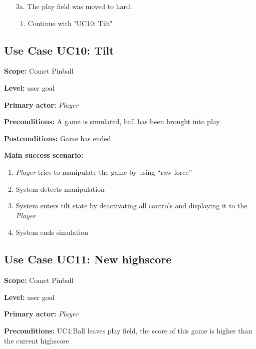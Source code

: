 \documentclass[fontsize=12pt,
               paper=a4,
               twoside=false,
               parskip=half,
               ]{scrartcl}
\begin{document}
\begin{itemize}[leftmargin=3em]
	\item[3a.]  The play field was moved to hard.
	\begin{enumerate}
		\item Continue with "UC10: Tilt"
	\end{enumerate}
\end{itemize}






\subsection{Use Case UC10: Tilt}

\textbf{\textsf{Scope:}} Comet Pinball

\textbf{\textsf{Level:}} user goal

\textbf{\textsf{Primary actor:}} \emph{Player}

\textbf{\textsf{Preconditions:}} A game is simulated, ball has been brought into play

\textbf{\textsf{Postconditions:}} Game has ended

\textbf{\textsf{Main success scenario:}}

\begin{enumerate}[leftmargin=3em]
	\item \emph{Player} tries to manipulate the game by using \enquote{raw force}
	\item System detects manipulation
	\item System enters tilt state by deactivating all controls and displaying it to the \emph{Player}
	\item System ends simulation
\end{enumerate}




\subsection{Use Case UC11: New highscore}

\textbf{\textsf{Scope:}} Comet Pinball

\textbf{\textsf{Level:}} user goal

\textbf{\textsf{Primary actor:}} \emph{Player}

\textbf{\textsf{Preconditions:}} UC4:Ball leaves play field, the score of this game is higher than the current highscore	
\end{document}
